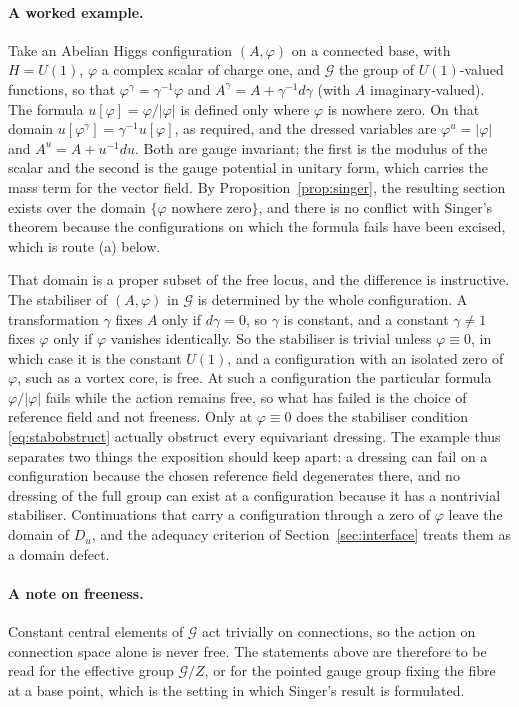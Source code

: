 \documentclass[11pt]{article}
\theoremstyle{plain}
\theoremstyle{definition}
\theoremstyle{remark}
\newcommand{\G}{\mathcal G}
\begin{document}
\paragraph{A worked example.} Take an Abelian Higgs configuration $(A,\varphi)$ on a connected base, with $H=U(1)$, $\varphi$ a complex scalar of charge one, and $\G$ the group of $U(1)$-valued functions, so that $\varphi^\gamma=\gamma^{-1}\varphi$ and $A^\gamma=A+\gamma^{-1}d\gamma$ (with $A$ imaginary-valued). The formula $u[\varphi]=\varphi/|\varphi|$ is defined only where $\varphi$ is nowhere zero. On that domain $u[\varphi^\gamma]=\gamma^{-1}u[\varphi]$, as required, and the dressed variables are $\varphi^u=|\varphi|$ and $A^u=A+u^{-1}du$. Both are gauge invariant; the first is the modulus of the scalar and the second is the gauge potential in unitary form, which carries the mass term for the vector field. By Proposition~\ref{prop:singer}, the resulting section exists over the domain $\{\varphi\text{ nowhere zero}\}$, and there is no conflict with Singer's theorem because the configurations on which the formula fails have been excised, which is route (a) below.

That domain is a proper subset of the free locus, and the difference is instructive. The stabiliser of $(A,\varphi)$ in $\G$ is determined by the whole configuration. A transformation $\gamma$ fixes $A$ only if $d\gamma=0$, so $\gamma$ is constant, and a constant $\gamma\neq1$ fixes $\varphi$ only if $\varphi$ vanishes identically. So the stabiliser is trivial unless $\varphi\equiv0$, in which case it is the constant $U(1)$, and a configuration with an isolated zero of $\varphi$, such as a vortex core, is free. At such a configuration the particular formula $\varphi/|\varphi|$ fails while the action remains free, so what has failed is the choice of reference field and not freeness. Only at $\varphi\equiv0$ does the stabiliser condition \eqref{eq:stabobstruct} actually obstruct every equivariant dressing. The example thus separates two things the exposition should keep apart: a dressing can fail on a configuration because the chosen reference field degenerates there, and no dressing of the full group can exist at a configuration because it has a nontrivial stabiliser. Continuations that carry a configuration through a zero of $\varphi$ leave the domain of $D_u$, and the adequacy criterion of Section~\ref{sec:interface} treats them as a domain defect.

\paragraph{A note on freeness.} Constant central elements of $\G$ act trivially on connections, so the action on connection space alone is never free. The statements above are therefore to be read for the effective group $\G/Z$, or for the pointed gauge group fixing the fibre at a base point, which is the setting in which Singer's result is formulated.
\end{document}
